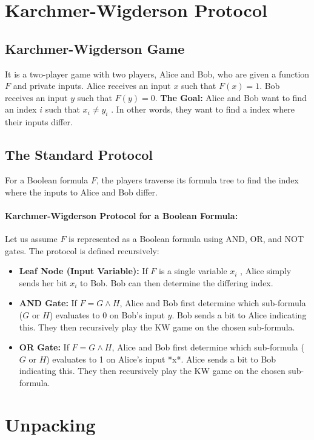 \documentclass{article}
\begin{document}
 
\section{Karchmer-Wigderson Protocol}

\subsection{Karchmer-Wigderson Game} 
It is a two-player game with two players, Alice and Bob, who are given a function $F$ and private inputs. 
Alice receives an input $x$ such that $F(x) = 1$.
Bob receives an input $y$ such that $F(y) = 0$.
\textbf{The Goal:} Alice and Bob want to find an index $i$ such that $x_i  \neq y_i$ . In other words, they want to find a index  where their inputs differ.

\subsection{The Standard Protocol}
For a Boolean formula $F$, the players traverse its formula tree to find the index where the inputs to Alice and Bob differ.

\paragraph{Karchmer-Wigderson Protocol for a Boolean Formula:}

Let us assume \(F\) is represented as a Boolean formula using AND, OR, and NOT gates. The protocol is defined recursively:

\begin{itemize}
    \item \textbf{Leaf Node (Input Variable):} If $F$ is a single variable $x_i$ , Alice simply sends her bit $x_i$  to Bob. Bob can then determine the differing index.
    \item \textbf{AND Gate:} If $F= G \wedge H$, Alice and Bob first determine which sub-formula ($G$ or $H$) evaluates to 0 on Bob's input $y$. Bob sends a bit to Alice indicating this. They then recursively play the KW game on the chosen sub-formula.
    \item \textbf{OR Gate:} If $F = G \wedge H$,  Alice and Bob first determine which sub-formula ($G$ or $H$) evaluates to 1 on Alice's input *x*. Alice sends a bit to Bob indicating this. They then recursively play the KW game on the chosen sub-formula.
\end{itemize}

\section{Unpacking} 
\end{document}
